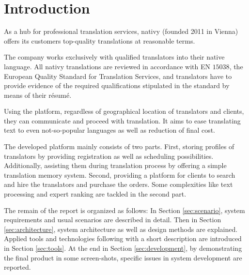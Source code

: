 \section{Introduction}
As a hub for professional translation services, nativy \cite{nativy}(founded 2011 in Vienna) offers its customers top-quality translations at reasonable terms. 

The company works exclusively with qualified translators into their native language. All nativy translations are reviewed in accordance with EN $15038$, the European Quality Standard for Translation Services, and translators have to provide evidence of the required qualifications stipulated in the standard by means of their résumé.

Using the platform, regardless of geographical location of translators and clients, they can communicate and proceed with translation. It aims to ease translating text to even not-so-popular languages as well as reduction of final cost.

The developed platform mainly consists of two parts. First, storing profiles of translators by providing registration as well as scheduling possibilities. Additionally, assisting them during translation process by offering a simple translation memory system. Second, providing a platform for clients to search and hire the translators and purchase the orders. Some complexities like text processing and expert ranking are tackled in the second part.

The remain of the report is organized as follows: In Section \ref{sec:scenario}, system requirements and usual scenarios are described in detail. Then in Section \ref{sec:architecture}, system architecture as well as design methods are explained. Applied tools and technologies following with a short description are introduced in Section \ref{sec:tools}. At the end in Section \ref{sec:development}, by demonstrating the final product in some screen-shots, specific issues in system development are reported.